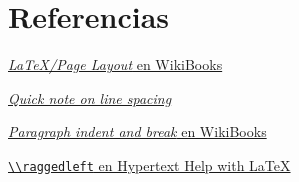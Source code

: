 \section{Referencias}\label{sec:referencias8}

\href{https://en.wikibooks.org/wiki/LaTeX/Page_Layout}{\emph{LaTeX/Page
Layout} en WikiBooks}

\href{http://texblog.org/2011/09/30/quick-note-on-line-spacing/}{\emph{Quick
note on line spacing}}

\href{https://en.wikibooks.org/wiki/LaTeX/Paragraph_Formatting\#Paragraph_indent_and_break}{\emph{Paragraph
indent and break} en WikiBooks}

\href{https://www.phy.duke.edu/~rgb/General/latex/ltx-300.html}{\lstinline!\\raggedleft!
en Hypertext Help with LaTeX}
